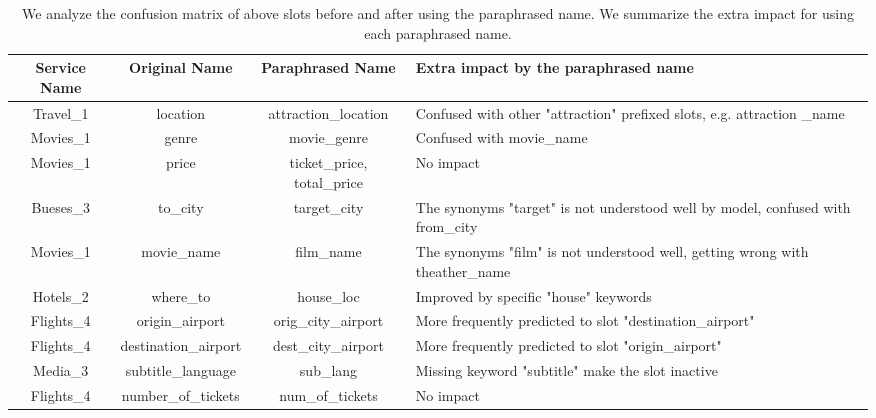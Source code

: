 \begin{table*}[!t]
\begin{center}{\scriptsize
\setlength{\tabcolsep}{3pt}
\begin{tabular}{ccc|l}
  \bottomrule
  \hline
Service Name & Original Name        & Paraphrased Name            & Extra impact by the paraphrased name                                            \\ \hline
Travel\_1    & location             & attraction\_location        & Confused with other "attraction" prefixed slots, e.g. attraction \_name         \\
Movies\_1    & genre                & movie\_genre                & Confused with movie\_name                                                       \\
Movies\_1    & price                & ticket\_price, total\_price & No impact                                                                       \\ \hline
Bueses\_3    & to\_city             & target\_city                & The synonyms "target" is not understood well by model, confused with from\_city \\
Movies\_1    & movie\_name          & film\_name                  & The synonyms "film" is not understood well, getting wrong with theather\_name   \\
Hotels\_2    & where\_to            & house\_loc                  & Improved by specific "house" keywords                                           \\ \hline
Flights\_4   & origin\_airport      & orig\_city\_airport         & More frequently predicted to slot "destination\_airport"                             \\
Flights\_4   & destination\_airport & dest\_city\_airport         & More frequently predicted to slot  "origin\_airport"                                  \\
Media\_3     & subtitle\_language   & sub\_lang                   & Missing keyword "subtitle" make the slot inactive                               \\
Flights\_4   & number\_of\_tickets  & num\_of\_tickets            & No impact                                                                       \\ \hline
\bottomrule
\end{tabular}
}
\end{center}
\caption{\label{tbl:heter-quali}We analyze the confusion matrix of
  above slots before and after using the paraphrased name. We summarize
  the extra impact for using each paraphrased name.  }
\end{table*}


